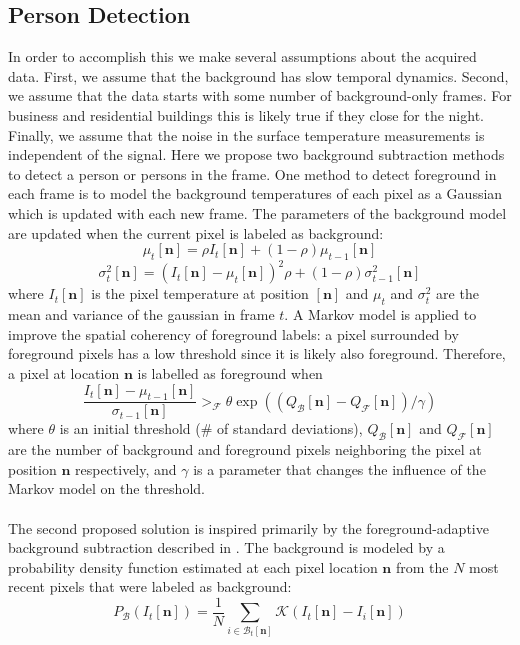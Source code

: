 \documentclass[12pt,oneside]{article} %
\begin{document}
\subsection{Person Detection}
In order to accomplish this
we make several assumptions about the acquired data. First, we assume that the background has slow temporal dynamics.
Second, we assume that the data starts with some number of background-only frames. For business and residential 
buildings this is likely true if they close for the night. Finally, we assume that the noise in the 
surface temperature measurements is independent of the signal.
Here we propose two background subtraction methods to detect a person or persons in the frame. 
One method to detect foreground in each frame is to model the background temperatures of each pixel as a 
Gaussian which is updated with each new frame. The parameters of the background model are updated when 
the current pixel is labeled as background:
$$\mu_t [\mathbf{n}] = \rho I_t [\mathbf{n}] + (1-\rho)\mu_{t-1} [\mathbf{n}]$$
$$\sigma_t^2 [\mathbf{n}] = (I_t [\mathbf{n}] - \mu_t [\mathbf{n}])^2 \rho + (1-\rho)\sigma_{t-1}^2 [\mathbf{n}]$$
where $I_t [\mathbf{n}]$ is the pixel temperature at position $ [\mathbf{n}]$ 
and $\mu_t$ and $\sigma_t^2$ are the mean and variance
of the gaussian in frame $t$. A Markov model is applied to improve the spatial coherency of foreground labels:
a pixel surrounded by foreground pixels has a low threshold since it is likely also foreground. Therefore,
a pixel at location $\mathbf{n}$ is labelled as foreground when
$$\frac{I_t [\mathbf{n}] - \mu_{t-1} [\mathbf{n}]}{\sigma_{t-1} [\mathbf{n}]} >_\mathcal{F} \theta \exp((Q_\mathcal{B} [\mathbf{n}] - Q_\mathcal{F} [\mathbf{n}]) / \gamma)$$
where $\theta$ is an initial threshold (\# of standard deviations), $Q_\mathcal{B}[\mathbf{n}]$ and $Q_\mathcal{F}[\mathbf{n}]$ are the number
of background and foreground pixels neighboring the pixel at position $ \mathbf{n}$ respectively, and $\gamma$ is a parameter that changes 
the influence of the Markov model on the threshold.
\\ \\
The second proposed solution is inspired primarily by the foreground-adaptive background subtraction described in
\cite{Mchugh09}.
The background is modeled by a probability density function estimated at each pixel location $\mathbf{n}$
from the $N$ most recent pixels that were labeled as background:
$$P_\mathcal{B}\left(I_t [\mathbf{n}]\right) = \frac{1}{N}\sum_{i \in \mathcal{B}_t[\mathbf{n}]} \mathcal{K}
	\left(I_t[\mathbf{n}] - I_i[\mathbf{n}] \right)$$
\end{document}
